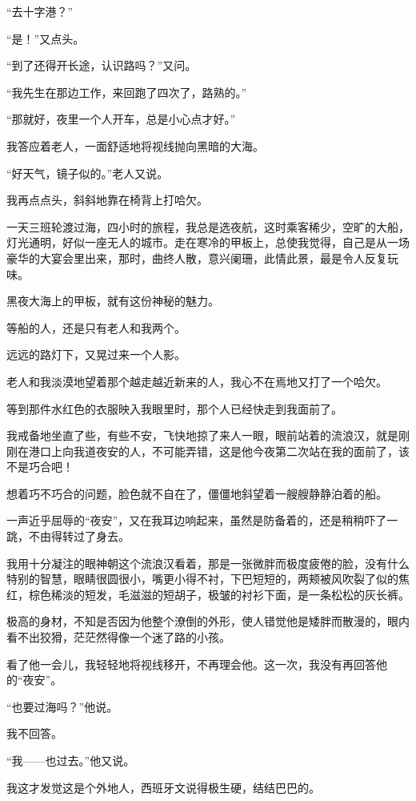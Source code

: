 \par “去十字港？”
\par “是！”又点头。
\par “到了还得开长途，认识路吗？”又问。
\par “我先生在那边工作，来回跑了四次了，路熟的。”
\par “那就好，夜里一个人开车，总是小心点才好。”
\par 我答应着老人，一面舒适地将视线抛向黑暗的大海。
\par “好天气，镜子似的。”老人又说。
\par 我再点点头，斜斜地靠在椅背上打哈欠。
\par 一天三班轮渡过海，四小时的旅程，我总是选夜航，这时乘客稀少，空旷的大船，灯光通明，好似一座无人的城市。走在寒冷的甲板上，总使我觉得，自己是从一场豪华的大宴会里出来，那时，曲终人散，意兴阑珊，此情此景，最是令人反复玩味。
\par 黑夜大海上的甲板，就有这份神秘的魅力。
\par 等船的人，还是只有老人和我两个。
\par 远远的路灯下，又晃过来一个人影。
\par 老人和我淡漠地望着那个越走越近新来的人，我心不在焉地又打了一个哈欠。
\par 等到那件水红色的衣服映入我眼里时，那个人已经快走到我面前了。
\par 我戒备地坐直了些，有些不安，飞快地掠了来人一眼，眼前站着的流浪汉，就是刚刚在港口上向我道夜安的人，不可能弄错，这是他今夜第二次站在我的面前了，该不是巧合吧！
\par 想着巧不巧合的问题，脸色就不自在了，僵僵地斜望着一艘艘静静泊着的船。
\par 一声近乎屈辱的“夜安”，又在我耳边响起来，虽然是防备着的，还是稍稍吓了一跳，不由得转过了身去。
\par 我用十分凝注的眼神朝这个流浪汉看着，那是一张微胖而极度疲倦的脸，没有什么特别的智慧，眼睛很圆很小，嘴更小得不衬，下巴短短的，两颊被风吹裂了似的焦红，棕色稀淡的短发，毛滋滋的短胡子，极皱的衬衫下面，是一条松松的灰长裤。
\par 极高的身材，不知是否因为他整个潦倒的外形，使人错觉他是矮胖而散漫的，眼内看不出狡猾，茫茫然得像一个迷了路的小孩。
\par 看了他一会儿，我轻轻地将视线移开，不再理会他。这一次，我没有再回答他的“夜安”。
\par “也要过海吗？”他说。
\par 我不回答。
\par “我——也过去。”他又说。
\par 我这才发觉这是个外地人，西班牙文说得极生硬，结结巴巴的。
